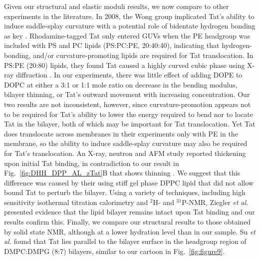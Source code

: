 Given our structural and elastic moduli results, we now compare to other 
experiments in the literature. In 2008, the Wong group implicated Tat’s 
ability to induce saddle-splay curvature
with a potential role of bidentate hydrogen bonding as key \cite{Mishra08}. 
Rhodamine-tagged Tat only entered GUVs when the PE headgroup was included with 
PS and PC lipids (PS:PC:PE, 20:40:40), indicating that hydrogen-bonding, and/or 
curvature-promoting lipids are required for Tat translocation. 
In PS:PE (20:80) lipids, they found Tat caused a highly curved cubic phase
using X-ray diffraction \cite{Mishra08}. In our experiments, there was little 
effect of adding DOPE to DOPC at either a 3:1 or 1:1 mole ratio on decrease in 
the bending modulus, bilayer thinning, or Tat’s outward movement with increasing 
concentration. Our two results are not inconsistent, however, since 
curvature-promotion appears not to be required for Tat’s ability to lower the 
energy required to bend nor to locate Tat in the bilayer, both of which may be 
important for Tat translocation. Yet Tat does translocate across
membranes in their experiments only with PE in the membrane, so the ability to 
induce saddle-splay curvature may also be required for Tat’s translocation. 
An X-ray, neutron and AFM study reported thickening upon initial Tat binding, 
in contradiction to our result in Fig.~\ref{fig:DHH_DPP_AL_zTat}B that shows 
thinning \cite{Choi12}. 
We suggest that this difference was caused by their using stiff gel phase DPPC 
lipid that did not allow bound Tat to perturb the bilayer. 
Using a variety of techniques, including high sensitivity isothermal titration 
calorimetry and $^2$H- and $^{31}$P-NMR, Ziegler \textit{et al.} \cite{Ziegler03}
presented evidence that the lipid bilayer remains intact upon Tat binding
and our results confirm this. Finally, we compare our structural results to 
those obtained by solid state NMR, although at a lower hydration level than in 
our sample. Su \textit{et al.} \cite{Su10} found that Tat lies parallel to the 
bilayer surface in the headgroup region of DMPC:DMPG (8:7) bilayers,
similar to our cartoon in Fig.~\ref{fig:figure9}.

